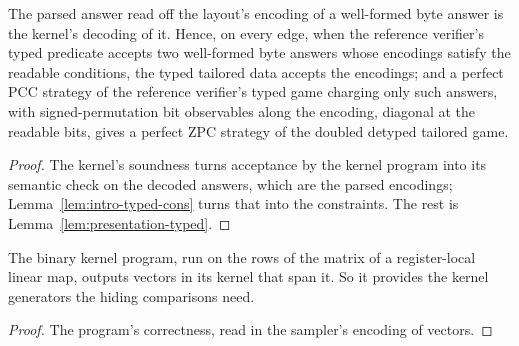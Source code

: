 \begin{lemma}
\label{lem:intro-presentation-complete}
\leanok
The parsed answer read off the layout's encoding of a well-formed byte answer is the kernel's
decoding of it. Hence, on every edge, when the reference verifier's typed predicate accepts two
well-formed byte answers whose encodings satisfy the readable conditions, the typed tailored
data accepts the encodings; and a perfect PCC strategy of the reference verifier's typed game
charging only such answers, with signed-permutation bit observables along the encoding, diagonal
at the readable bits, gives a perfect ZPC strategy of the doubled detyped tailored game.
\end{lemma}

\begin{proof}
\leanok
The kernel's soundness turns acceptance by the kernel program into its semantic check on the
decoded answers, which are the parsed encodings; Lemma~\ref{lem:intro-typed-cons} turns that into
the constraints. The rest is Lemma~\ref{lem:presentation-typed}.
\end{proof}

\begin{lemma}
\label{lem:intro-kergens}
\leanok
The binary kernel program, run on the rows of the matrix of a register-local linear map, outputs
vectors in its kernel that span it. So it provides the kernel generators the hiding comparisons
need.
\end{lemma}

\begin{proof}
\leanok
The program's correctness, read in the sampler's encoding of vectors.
\end{proof}


